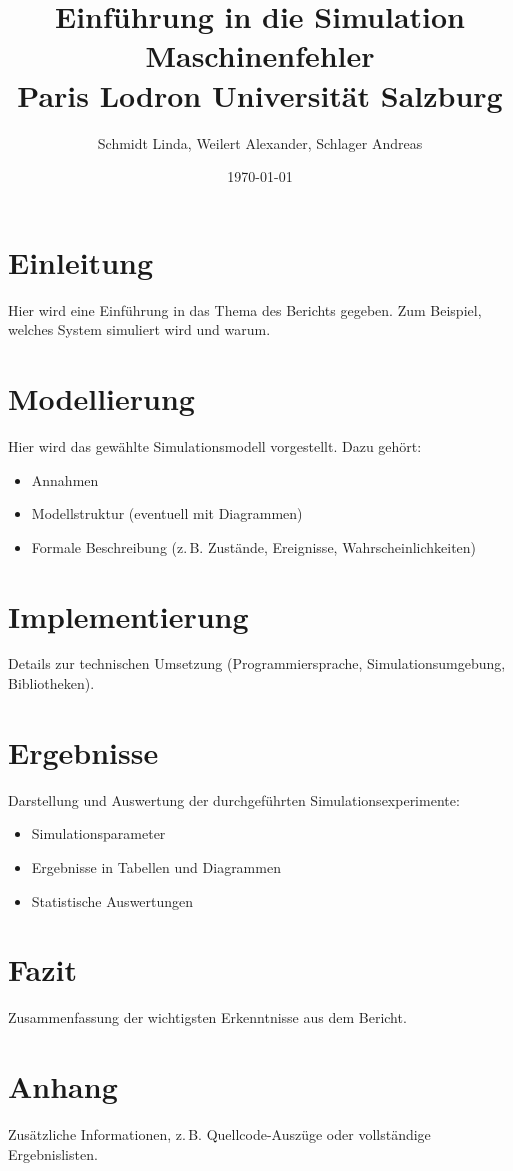 \documentclass[a4paper,12pt]{article}
\title{
    \Huge{Einführung in die Simulation\\Maschinenfehler} \\
    \vspace{0.5cm}
    \large{Paris Lodron Universität Salzburg}
}
\author{
    Schmidt Linda, Weilert Alexander, Schlager Andreas \\
}
\date{\today}
\begin{document}
    \maketitle
    \thispagestyle{empty}
    \newpage

    \tableofcontents
    \newpage

    \section{Einleitung}
    Hier wird eine Einführung in das Thema des Berichts gegeben. Zum Beispiel, welches System simuliert wird und warum.

    \newpage

    \section{Modellierung}
    Hier wird das gewählte Simulationsmodell vorgestellt. Dazu gehört:
    \begin{itemize}
        \item Annahmen
        \item Modellstruktur (eventuell mit Diagrammen)
        \item Formale Beschreibung (z.\,B. Zustände, Ereignisse, Wahrscheinlichkeiten)
    \end{itemize}

    \newpage

    \section{Implementierung}
    Details zur technischen Umsetzung (Programmiersprache, Simulationsumgebung, Bibliotheken).

    \newpage

    \section{Ergebnisse}
    Darstellung und Auswertung der durchgeführten Simulationsexperimente:
    \begin{itemize}
        \item Simulationsparameter
        \item Ergebnisse in Tabellen und Diagrammen
        \item Statistische Auswertungen
    \end{itemize}

    \section{Fazit}
    Zusammenfassung der wichtigsten Erkenntnisse aus dem Bericht.

    \newpage
    \appendix

    \section{Anhang}
    Zusätzliche Informationen, z.\,B. Quellcode-Auszüge oder vollständige Ergebnislisten.
\end{document}
